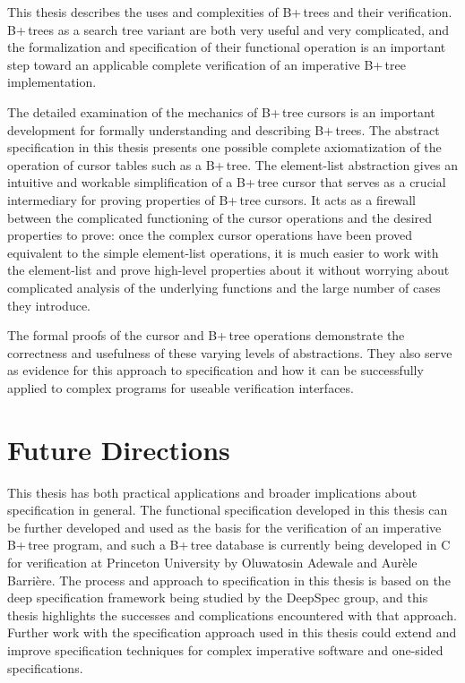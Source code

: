 \documentclass[a4paper,12pt]{article}
\begin{document}
This thesis describes the uses and complexities of B+\,trees and their verification. B+\,trees as a search tree variant are both very useful and very complicated, and the formalization and specification of their functional operation is an important step toward an applicable complete verification of an imperative B+\,tree implementation.

The detailed examination of the mechanics of B+\,tree cursors is an important development for formally understanding and describing B+\,trees. The abstract specification in this thesis presents one possible complete axiomatization of the operation of cursor tables such as a B+\,tree. The element-list abstraction gives an intuitive and workable simplification of a B+\,tree cursor that serves as a crucial intermediary for proving properties of B+\,tree cursors. It acts as a firewall between the complicated functioning of the cursor operations and the desired properties to prove: once the complex cursor operations have been proved equivalent to the simple element-list operations, it is much easier to work with the element-list and prove high-level properties about it without worrying about complicated analysis of the underlying functions and the large number of cases they introduce.

The formal proofs of the cursor and B+\,tree operations demonstrate the correctness and usefulness of these varying levels of abstractions. They also serve as evidence for this approach to specification and how it can be successfully applied to complex programs for useable verification interfaces.

\clearpage

\section{Future Directions}

This thesis has both practical applications and broader implications about specification in general. The functional specification developed in this thesis can be further developed and used as the basis for the verification of an imperative B+\,tree program, and such a B+\,tree database is currently being developed in C for verification at Princeton University by Oluwatosin Adewale and Aurèle Barrière. The process and approach to specification in this thesis is based on the deep specification framework being studied by the DeepSpec group, and this thesis highlights the successes and complications encountered with that approach. Further work with the specification approach used in this thesis could extend and improve specification techniques for complex imperative software and one-sided specifications.

\clearpage


\end{document}
